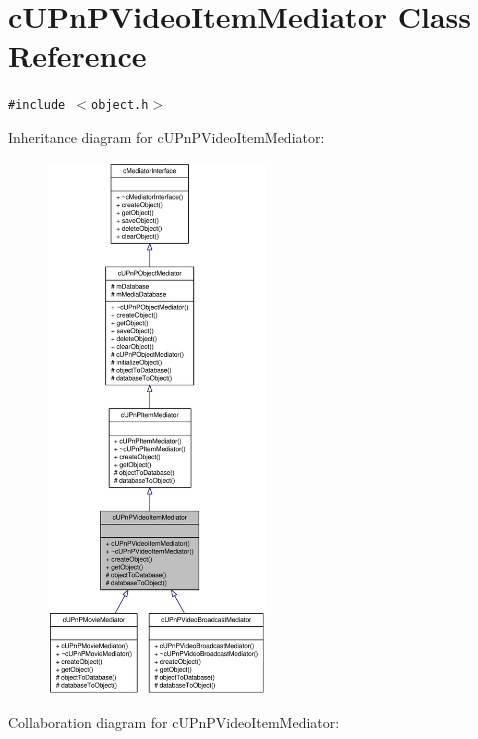 \hypertarget{classcUPnPVideoItemMediator}{
\section{cUPnPVideoItemMediator Class Reference}
\label{classcUPnPVideoItemMediator}
}
{\tt \#include $<$object.h$>$}

Inheritance diagram for cUPnPVideoItemMediator:\nopagebreak
\begin{figure}[H]
\begin{center}
\leavevmode
\includegraphics[height=400pt]{classcUPnPVideoItemMediator__inherit__graph}
\end{center}
\end{figure}
Collaboration diagram for cUPnPVideoItemMediator:\nopagebreak

